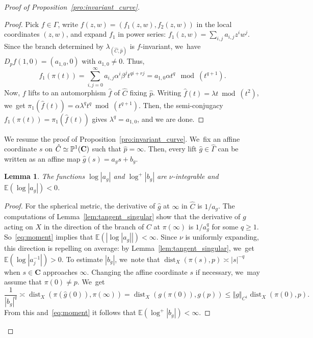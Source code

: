 \documentclass[11pt]{article}
\newcommand{\norm}[1]{{\left\Vert#1\right\Vert}}
\newcommand{\abs}[1]{\left\vert#1\right\vert}
\newcommand{\unsur}[1]{\frac{1}{#1}}
\newcommand{\inv}{^{-1}}
\DeclareMathOperator{\dist}{dist}
\newcommand{\ee}{\mathbb{E}}
\def\C{\mathbf{C}}
\theoremstyle{plain}
\newtheorem{lem}[thm]{Lemma}
\theoremstyle{definition}
\numberwithin{equation}{section}
\begin{document}
\begin{proof}[Proof of Proposition~\ref{pro:invariant_curve}]
\begin{proof}
Pick $f\in \Gamma$, write
$f(z,w) = (f_1(z,w), f_2(z,w))$ in the local coordinates $(z,w)$, and expand $f_1$ in power series: $f_1(z,w) = \sum_{i,j} a_{i,j}z^iw^j$.
Since the branch determined by $\lambda_{(\hat C, \hat{p})}$ is $f$-invariant, we~have $D_{p}f(1,0) = (a_{1,0}, 0)$ with $a_{1,0}\neq 0$. Thus,
\begin{equation*} f_1(\pi(t))
= \sum_{i,j=0}^\infty a_{i,j}\alpha^i\beta^j t^{qi+rj}
= a_{1, 0} \alpha t^q \mod(t^{q+1}).
\end{equation*}
Now, $f$ lifts to an automorphism $\hat f$ of $\hat C$ fixing $\hat p$. Writing
$\hat f(t) = \lambda t \bmod(t^2)$, we~get $\pi_1(\hat f(t)) = \alpha \lambda^q t^q \bmod(t^{q+1})$. Then,
the semi-conjugacy $f_1(\pi(t)) = \pi_1(\hat f(t))$ gives $ \lambda^q = a_{1, 0}$, and we are done.
\end{proof}

We resume the proof of Proposition~\ref{pro:invariant_curve}. We~fix an affine coordinate $s$ on $\hat C\simeq \P^1(\C)$ such that $\hat p = \infty$. Then, every lift $\hat g \in \hat\Gamma$ can be written as an affine map $\hat g(s) = a_g s+b_g$.

\begin{lem}\label{lem:integrability}
The functions $\log \abs{a_g}$ and $\log^+\abs{b_g}$ are $\nu$-integrable and \hbox{$\ee( \log \abs{a_g})\!<\!0$}.
\end{lem}

\begin{proof}
For the spherical metric, the derivative of $\hat g$ at $ \infty$ in $\hat C$ is $1/a_g$. The computations
of Lemma~\ref{lem:tangent_singular} show that the derivative
of $g$ acting on $X$ in the direction of the branch of $C$ at $\pi(\infty)$
is $1/a_g^q$ for some $q\geq 1$. So~\eqref{eq:moment} implies that $\ee( \abs{\log \abs{a_g}})<\infty$.
Since $\nu$ is uniformly expanding, this direction
is repelling on average: by Lemma~\ref{lem:tangent_singular}, we~get
$\ee( \log \abs{a_j\inv})>0$.
To estimate $\abs{b_g}$, we~note that
$\dist_X(\pi(s), p) \asymp \abs{s}^{-q}$ when $s\in \C$ approaches $\infty$. Changing the affine coordinate $s$ if necessary, we~may assume that
$\pi(0)\neq p$. We~get
\begin{equation*}
\unsur{\abs{b_g}^q} \asymp \dist_X (\pi(\hat g(0)), \pi(\infty)) = \dist_X(g(\pi(0)), g(p))\leq \norm{g}_{C^1} \dist_X(\pi(0), p).
\end{equation*}
From this and~\eqref{eq:moment} it follows that $\ee(\log^+\abs{b_g})<\infty$.
\end{proof}


\end{proof}
\end{document}
